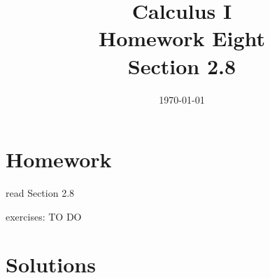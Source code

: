 \documentclass[letterpaper, landscape]{exam}
\title{Calculus I \\ Homework Eight \\ Section 2.8}
\author{}
\date{\today}
\begin{document}
  \maketitle

  \section{Homework}
    \begin{itemize*}
      \item read Section 2.8
      \item exercises: TO DO
    \end{itemize*}

  \ifprintanswers

  \section{Solutions}
\end{document}
